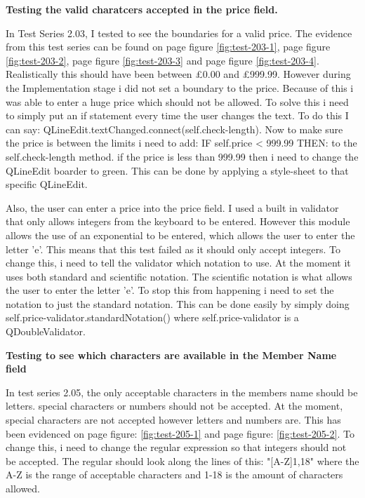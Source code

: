 \textbf{Testing the valid charatcers accepted in the price field.}

In Test Series 2.03, I tested to see the boundaries for a valid price. The evidence from this test series can be found on  page \pageref{fig:test-203-1} figure \ref{fig:test-203-1}, page \pageref{fig:test-203-2} figure \ref{fig:test-203-2}, page \pageref{fig:test-203-3} figure \ref{fig:test-203-3} and page \pageref{fig:test-203-4} figure \ref{fig:test-203-4}. Realistically this should have been between £0.00 and £999.99. However during the Implementation stage i did not set a boundary to the price. Because of this i was able to enter a huge price which should not be allowed. To solve this i need to simply put an if statement every time the user changes the text. To do this I can say: QLineEdit.textChanged.connect(self.check-length). Now to make sure the price is between the limits i need to add: IF self.price < 999.99 THEN: to the self.check-length method. if the price is less than 999.99 then i need to change the QLineEdit boarder to green. This can be done by applying a style-sheet to that specific QLineEdit.

Also, the user can enter a price into the price field. I used a built in validator that only allows integers from the keyboard to be entered. However this module allows the use of an exponential to be entered, which allows the user to enter the letter 'e'. This means that this test failed as it should only accept integers. To change this, i need to tell the validator which notation to use. At the moment it uses both standard and scientific notation. The scientific notation is what allows the user to enter the letter 'e'. To stop this from happening i need to set the notation to just the standard notation. This can be done easily by simply doing self.price-validator.standardNotation() where self.price-validator is a QDoubleValidator.

\textbf{Testing to see which characters are available in the Member Name field}

In test series 2.05, the only acceptable characters in the members name should be letters. special characters or numbers should not be accepted. At the moment, special characters are not accepted however letters and numbers are. This has been evidenced on page \pageref{fig:test-205-1} figure: \ref{fig:test-205-1}  and page \pageref{fig:test-205-2} figure: \ref{fig:test-205-2}. To change this, i need to change the regular expression so that integers should not be accepted. The regular should look along the lines of this: "[A-Z]{1,18}" where the A-Z is the range  of acceptable characters and 1-18 is the amount of characters allowed. 


